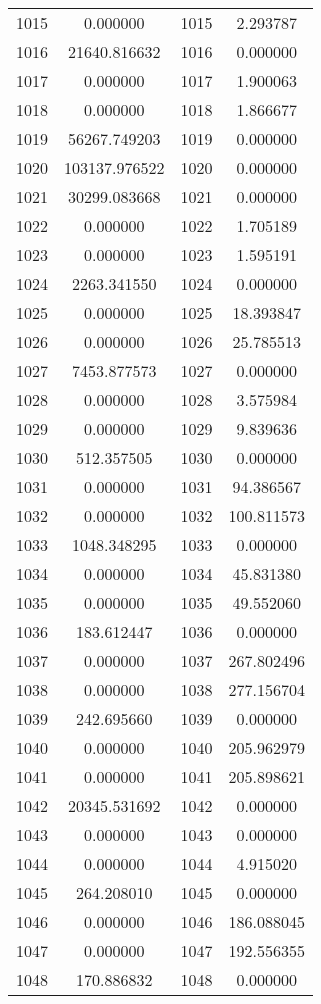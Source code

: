 \documentclass[12pt]{article}
\begin{document}
\begin{longtable}{@{}cccc@{}}
1015 & 0.000000 & 1015 & 2.293787 \\
1016 & 21640.816632 & 1016 & 0.000000 \\
1017 & 0.000000 & 1017 & 1.900063 \\
1018 & 0.000000 & 1018 & 1.866677 \\
1019 & 56267.749203 & 1019 & 0.000000 \\
1020 & 103137.976522 & 1020 & 0.000000 \\
1021 & 30299.083668 & 1021 & 0.000000 \\
1022 & 0.000000 & 1022 & 1.705189 \\
1023 & 0.000000 & 1023 & 1.595191 \\
1024 & 2263.341550 & 1024 & 0.000000 \\
1025 & 0.000000 & 1025 & 18.393847 \\
1026 & 0.000000 & 1026 & 25.785513 \\
1027 & 7453.877573 & 1027 & 0.000000 \\
1028 & 0.000000 & 1028 & 3.575984 \\
1029 & 0.000000 & 1029 & 9.839636 \\
1030 & 512.357505 & 1030 & 0.000000 \\
1031 & 0.000000 & 1031 & 94.386567 \\
1032 & 0.000000 & 1032 & 100.811573 \\
1033 & 1048.348295 & 1033 & 0.000000 \\
1034 & 0.000000 & 1034 & 45.831380 \\
1035 & 0.000000 & 1035 & 49.552060 \\
1036 & 183.612447 & 1036 & 0.000000 \\
1037 & 0.000000 & 1037 & 267.802496 \\
1038 & 0.000000 & 1038 & 277.156704 \\
1039 & 242.695660 & 1039 & 0.000000 \\
1040 & 0.000000 & 1040 & 205.962979 \\
1041 & 0.000000 & 1041 & 205.898621 \\
1042 & 20345.531692 & 1042 & 0.000000 \\
1043 & 0.000000 & 1043 & 0.000000 \\
1044 & 0.000000 & 1044 & 4.915020 \\
1045 & 264.208010 & 1045 & 0.000000 \\
1046 & 0.000000 & 1046 & 186.088045 \\
1047 & 0.000000 & 1047 & 192.556355 \\
1048 & 170.886832 & 1048 & 0.000000 \\

\end{longtable}
\end{document}
